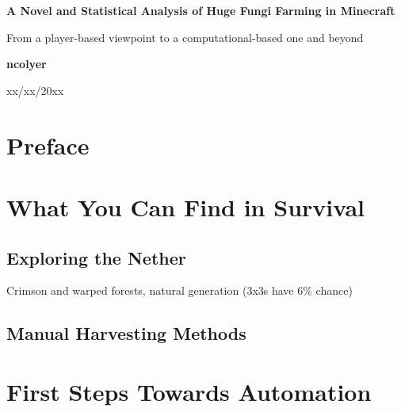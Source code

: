 \documentclass[11pt,a4paper]{article}
\begin{document}
\begin{titlepage}
    \begin{center}
        \vspace*{1cm}
        
        \Huge
        \textbf{A Novel and Statistical Analysis of Huge Fungi Farming in Minecraft}
        
        \vspace{0.5cm}
        \LARGE
        From a player-based viewpoint to a computational-based one and beyond
        
        \vspace{1.5cm}
        
        \textbf{ncolyer}
        
        \vfill
        
        \vspace{0.8cm}
        
        \Large

        xx/xx/20xx
        
    \end{center}
\end{titlepage}

\newpage
\tableofcontents
\newpage

\section*{Preface}
\lipsum[3]
\newpage

\section{What You Can Find in Survival}
    \subsection{Exploring the Nether}
Crimson and warped forests, natural generation (3x3s have 6\% chance)
    \lipsum[6]
    \subsection{Manual Harvesting Methods}
    \lipsum[7]

\section{First Steps Towards Automation}
\end{document}
